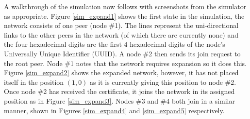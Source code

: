 \documentclass[ %
                    author={Luke Murray},
                supervisor={Dr. Simon Hollis},
                     title={Shadow Peer-to-Peer Networks},
                  subtitle={},
                    degree={MEng},
                      year={2013} ]{thesis}
\begin{document}
A walkthrough of the simulation now follows with screenshots from the simulator as appropriate. Figure \ref{sim_expand1} shows the first state in the simulation, the network consists of one peer (node \#1). The lines represent the uni-directional links to the other peers in the network (of which there are currently none) and the four hexadecimal digits are the first 4 hexadecimal digits of the node's Universally Unique Identifier (UUID). A node \#2 then sends its join request to the root peer. Node \#1 notes that the network requires expansion so it does this. Figure \ref{sim_expand2} shows the expanded network, however, it has not placed itself in the position $(1,0)$ as it is currently giving this position to node \#2. Once node \#2 has received the certificate, it joins the network in its assigned position as in Figure \ref{sim_expand3}. Nodes \#3 and \#4 both join in a similar manner, shown in Figures \ref{sim_expand4} and \ref{sim_expand5} respectively.
\end{document}
